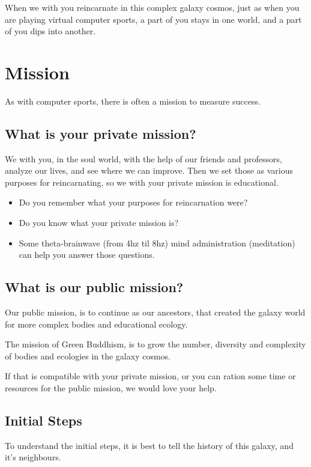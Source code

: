 \documentclass{report}
\begin{document}
When we with you reincarnate in this complex galaxy cosmos, just as when you are 
playing virtual computer sports, a part of you stays in one world, and a part
of you dips into another.

\section{Mission}
\label{mission}

As with computer sports, there is often a mission to measure success.

\subsection{What is your private mission?}

We with you, in the soul world, with the help of our friends and professors,
 analyze our lives, and see where we can improve. Then we set those as various
purposes for reincarnating, so we with your private mission is educational.

\begin{itemize}
\item Do you remember what your purposes for reincarnation were?
\item Do you know what your private mission is?
\item Some theta-brainwave (from 4hz til 8hz) mind administration (meditation) can help you answer those
questions. 
\end{itemize}

\subsection{What is our public mission?}

Our public mission, is to continue as our ancestors, that created the galaxy
world for more complex bodies and educational ecology.  


The mission of Green Buddhism, is to grow the number, diversity and complexity of bodies and
ecologies in the galaxy cosmos. 

If that is compatible with your private mission, or you can ration some time or
resources for
the public mission, we would love your help.

\subsection{Initial Steps}

To understand the initial steps, it is best to tell the history of this galaxy,
and it's neighbours.
\end{document}
